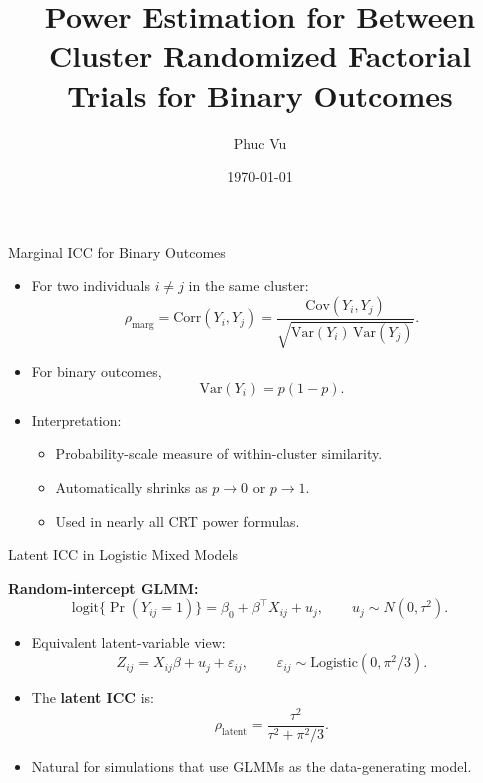 \documentclass[aspectratio=169]{beamer} %
\title[BST 245]{Power Estimation for Between Cluster Randomized Factorial Trials for Binary Outcomes}
\author{Phuc Vu}
\institute{HSPH}
\date{\today} %
\begin{document}
\begin{frame}{Marginal ICC for Binary Outcomes}

\begin{itemize}
  \item For two individuals $i \neq j$ in the same cluster:
  \[
    \rho_{\text{marg}}
    = \mathrm{Corr}(Y_{i}, Y_{j})
    = \frac{\mathrm{Cov}(Y_i, Y_j)}
           {\sqrt{\mathrm{Var}(Y_i)\,\mathrm{Var}(Y_j)}} .
  \]
  \medskip
  
  \item For binary outcomes,
  \[
    \mathrm{Var}(Y_i) = p(1-p).
  \]
  
  \item Interpretation:
    \begin{itemize}
      \item Probability-scale measure of within-cluster similarity.
      \item Automatically shrinks as $p \to 0$ or $p \to 1$.
      \item Used in nearly all CRT power formulas.
    \end{itemize}
\end{itemize}

\end{frame}
\begin{frame}{Latent ICC in Logistic Mixed Models}

\textbf{Random-intercept GLMM:}
\[
  \text{logit}\{\Pr(Y_{ij}=1)\}
   = \beta_0 + \beta^\top X_{ij} + u_j,
  \qquad
  u_j \sim N(0,\tau^2).
\]

\begin{itemize}
  \item Equivalent latent-variable view:
  \[
    Z_{ij} = X_{ij}\beta + u_j + \varepsilon_{ij}, 
    \qquad
    \varepsilon_{ij} \sim \text{Logistic}(0,\pi^2/3).
  \]

  \item The \textbf{latent ICC} is:
  \[
    \rho_{\text{latent}}
    = \frac{\tau^2}{\tau^2 + \pi^2/3}.
  \]

  \item Natural for simulations that use GLMMs as the data-generating model.
\end{itemize}

\end{frame}
\end{document}

